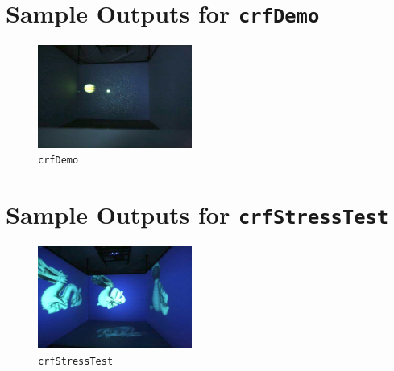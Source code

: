 \section{Sample Outputs for \texttt{crfDemo}}
\begin{figure}[H]
	\centering
		\includegraphics[width=0.45\textwidth]{../figures/fotos/demo_app}
		\caption{\texttt{crfDemo}}
\end{figure}

\section{Sample Outputs for \texttt{crfStressTest}}
\begin{figure}[H]
	\centering
		\includegraphics[width=0.45\textwidth]{../figures/fotos/demo_stressTest}
	\caption{\texttt{crfStressTest}}
\end{figure}